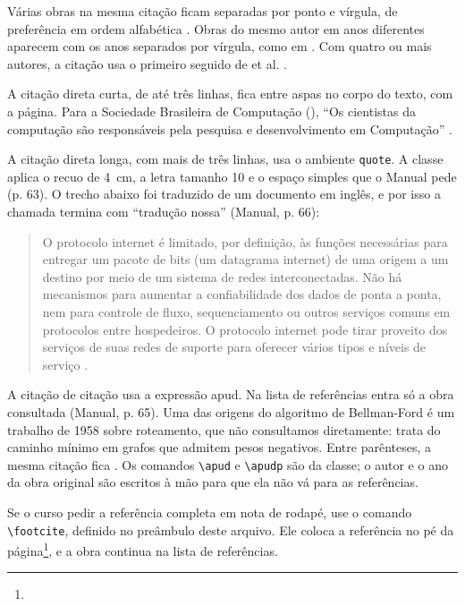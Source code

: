 \documentclass[diss,capa]{texufpel}
\newcommand{\footcite}[1]{\footnote{\bibentry{#1}}}
\begin{document}
Várias obras na mesma citação ficam separadas por ponto e vírgula, de
preferência em ordem alfabética \citep{Hoare:1969:ABC,Lamport:1978:TCO}.
Obras do mesmo autor em anos diferentes aparecem com os anos separados por
vírgula, como em \citet{Turing:1937:OCN,Turing:1950:CMI}. Com quatro ou mais
autores, a citação usa o primeiro seguido de et al. \citep{Cormen:2022:IA}.

A citação direta curta, de até três linhas, fica entre aspas no corpo do
texto, com a página. Para a Sociedade Brasileira de Computação
(), ``Os cientistas da
computação são responsáveis pela pesquisa e desenvolvimento em Computação''
\citep[p.~30]{Zorzo:2017:RFC}.

A citação direta longa, com mais de três linhas, usa o ambiente
\texttt{quote}. A classe aplica o recuo de 4~cm, a letra tamanho 10 e o espaço
simples que o Manual pede (p. 63). O trecho abaixo foi traduzido de um
documento em inglês, e por isso a chamada termina com ``tradução nossa''
(Manual, p. 66):

\begin{quote}
O protocolo internet é limitado, por definição, às funções necessárias para
entregar um pacote de bits (um datagrama internet) de uma origem a um destino
por meio de um sistema de redes interconectadas. Não há mecanismos para
aumentar a confiabilidade dos dados de ponta a ponta, nem para controle de
fluxo, sequenciamento ou outros serviços comuns em protocolos entre
hospedeiros. O protocolo internet pode tirar proveito dos serviços de suas
redes de suporte para oferecer vários tipos e níveis de serviço
\citep[p.~1, tradução nossa]{Postel:1981:IP}.
\end{quote}

A citação de citação usa a expressão apud. Na lista de referências entra só a
obra consultada (Manual, p. 65). Uma das origens do algoritmo de Bellman-Ford é um
trabalho de 1958 sobre roteamento, que não consultamos diretamente:
 trata do caminho mínimo em grafos que
admitem pesos negativos. Entre parênteses, a mesma citação fica
. Os comandos \verb|\apud| e
\verb|\apudp| são da classe; o autor e o ano da obra original são escritos à
mão para que ela não vá para as referências.

Se o curso pedir a referência completa em nota de rodapé, use o comando
\verb|\footcite|, definido no preâmbulo deste arquivo. Ele coloca a referência
no pé da página\footcite{Postel:1981:IP}, e a obra continua na lista de
referências.
\end{document}
